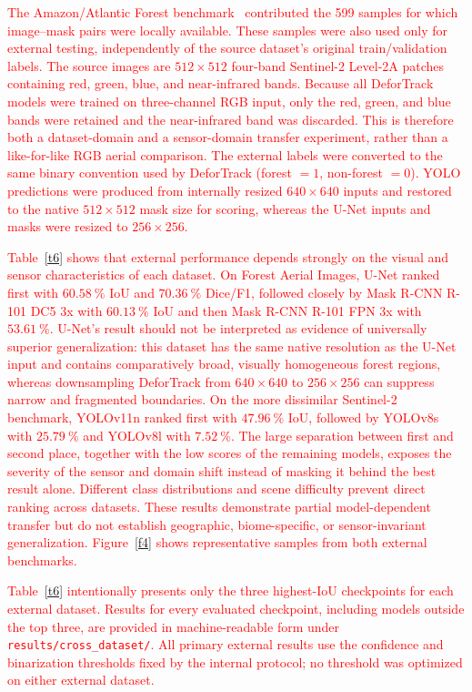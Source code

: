 \documentclass[journal,article,submit,pdftex,moreauthors]{Definitions/mdpi}
\begin{document}
\textcolor{red}{The Amazon/Atlantic Forest benchmark~\cite{bragagnolo2021amazon} contributed the 599 samples for which image--mask pairs were locally available. These samples were also used only for external testing, independently of the source dataset's original train/validation labels. The source images are $512\times512$ four-band Sentinel-2 Level-2A patches containing red, green, blue, and near-infrared bands. Because all DeforTrack models were trained on three-channel RGB input, only the red, green, and blue bands were retained and the near-infrared band was discarded. This is therefore both a dataset-domain and a sensor-domain transfer experiment, rather than a like-for-like RGB aerial comparison. The external labels were converted to the same binary convention used by DeforTrack (forest $=1$, non-forest $=0$). YOLO predictions were produced from internally resized $640\times640$ inputs and restored to the native $512\times512$ mask size for scoring, whereas the U-Net inputs and masks were resized to $256\times256$.}

\textcolor{red}{Table~\ref{t6} shows that external performance depends strongly on the visual and sensor characteristics of each dataset. On Forest Aerial Images, U-Net ranked first with $60.58~\%$ IoU and $70.36~\%$ Dice/F1, followed closely by Mask R-CNN R-101 DC5 3x with $60.13~\%$ IoU and then Mask R-CNN R-101 FPN 3x with $53.61~\%$. U-Net's result should not be interpreted as evidence of universally superior generalization: this dataset has the same native resolution as the U-Net input and contains comparatively broad, visually homogeneous forest regions, whereas downsampling DeforTrack from $640\times640$ to $256\times256$ can suppress narrow and fragmented boundaries. On the more dissimilar Sentinel-2 benchmark, YOLOv11n ranked first with $47.96~\%$ IoU, followed by YOLOv8s with $25.79~\%$ and YOLOv8l with $7.52~\%$. The large separation between first and second place, together with the low scores of the remaining models, exposes the severity of the sensor and domain shift instead of masking it behind the best result alone. Different class distributions and scene difficulty prevent direct ranking across datasets. These results demonstrate partial model-dependent transfer but do not establish geographic, biome-specific, or sensor-invariant generalization. Figure~\ref{f4} shows representative samples from both external benchmarks.}

\textcolor{red}{Table~\ref{t6} intentionally presents only the three highest-IoU checkpoints for each external dataset. Results for every evaluated checkpoint, including models outside the top three, are provided in machine-readable form under \texttt{results/cross\_dataset/}. All primary external results use the confidence and binarization thresholds fixed by the internal protocol; no threshold was optimized on either external dataset.}
\end{document}
